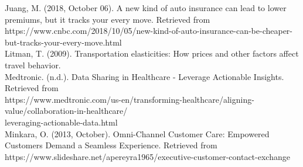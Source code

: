 \documentclass[11pt]{article}
\begin{document}
Juang, M. (2018, October 06). A new kind of auto insurance can lead to lower premiums, but it tracks your every move. Retrieved from https://www.cnbc.com/2018/10/05/new-kind-of-auto-insurance-can-be-cheaper-but-tracks-your-every-move.html \\

Litman, T. (2009). Transportation elasticities: How prices and other factors affect travel behavior.\\

Medtronic. (n.d.). Data Sharing in Healthcare - Leverage Actionable Insights. Retrieved from \\https://www.medtronic.com/us-en/transforming-healthcare/aligning-value/collaboration-in-healthcare/ \\leveraging-actionable-data.html \\

Minkara, O. (2013, October). Omni-Channel Customer Care: Empowered Customers Demand a Seamless Experience. Retrieved from https://www.slideshare.net/apereyra1965/executive-customer-contact-exchange \\
\end{document}
